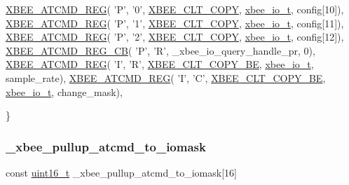 \begin{DoxyCode}
   \hyperlink{group__xbee__atcmd_gaafe33c3d8ea48b42b25d1183eaf93071}{XBEE\_ATCMD\_REG}( \textcolor{charliteral}{'P'}, \textcolor{charliteral}{'0'}, \hyperlink{group__xbee__atcmd_gga1bd8ecd38c107579d20ded3c79a7d70baef8d715c8725d801676943b868508633}{XBEE\_CLT\_COPY}, \hyperlink{structxbee__io__t}{xbee\_io\_t}, config[10]),
   \hyperlink{group__xbee__atcmd_gaafe33c3d8ea48b42b25d1183eaf93071}{XBEE\_ATCMD\_REG}( \textcolor{charliteral}{'P'}, \textcolor{charliteral}{'1'}, \hyperlink{group__xbee__atcmd_gga1bd8ecd38c107579d20ded3c79a7d70baef8d715c8725d801676943b868508633}{XBEE\_CLT\_COPY}, \hyperlink{structxbee__io__t}{xbee\_io\_t}, config[11]),
   \hyperlink{group__xbee__atcmd_gaafe33c3d8ea48b42b25d1183eaf93071}{XBEE\_ATCMD\_REG}( \textcolor{charliteral}{'P'}, \textcolor{charliteral}{'2'}, \hyperlink{group__xbee__atcmd_gga1bd8ecd38c107579d20ded3c79a7d70baef8d715c8725d801676943b868508633}{XBEE\_CLT\_COPY}, \hyperlink{structxbee__io__t}{xbee\_io\_t}, config[12]),
   \hyperlink{group__xbee__atcmd_gabbaf60bd4d186b860fd58c8a6111e9f9}{XBEE\_ATCMD\_REG\_CB}( \textcolor{charliteral}{'P'}, \textcolor{charliteral}{'R'}, \_xbee\_io\_query\_handle\_pr, 0),
   \hyperlink{group__xbee__atcmd_gaafe33c3d8ea48b42b25d1183eaf93071}{XBEE\_ATCMD\_REG}( \textcolor{charliteral}{'I'}, \textcolor{charliteral}{'R'}, \hyperlink{group__xbee__atcmd_gga1bd8ecd38c107579d20ded3c79a7d70ba0be0c682bc30049849b0c169b661c537}{XBEE\_CLT\_COPY\_BE}, 
      \hyperlink{structxbee__io__t}{xbee\_io\_t}, sample\_rate),
   \hyperlink{group__xbee__atcmd_gaafe33c3d8ea48b42b25d1183eaf93071}{XBEE\_ATCMD\_REG}( \textcolor{charliteral}{'I'}, \textcolor{charliteral}{'C'}, \hyperlink{group__xbee__atcmd_gga1bd8ecd38c107579d20ded3c79a7d70ba0be0c682bc30049849b0c169b661c537}{XBEE\_CLT\_COPY\_BE}, 
      \hyperlink{structxbee__io__t}{xbee\_io\_t}, change\_mask),

\}
\end{DoxyCode}
\mbox{\label{group__xbee__io_gabcf9c9881057623ef7b28330631fad9b}} 
\subsubsection{\texorpdfstring{\+\_\+xbee\+\_\+pullup\+\_\+atcmd\+\_\+to\+\_\+iomask}{\_xbee\_pullup\_atcmd\_to\_iomask}}
{\footnotesize\ttfamily const \hyperlink{group__hal__dos_ga5a8b2dc9e45a9ee81a94ef304fb62505}{uint16\+\_\+t} \+\_\+xbee\+\_\+pullup\+\_\+atcmd\+\_\+to\+\_\+iomask\mbox{[}16\mbox{]}}

